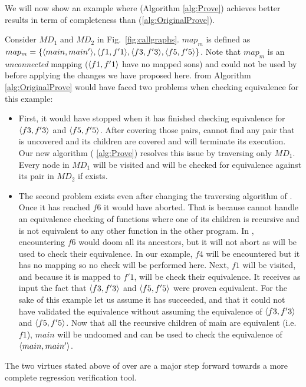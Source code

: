 We will now show an example where  (Algorithm \ref{alg:Prove}) achieves better results in term of completeness than  (\ref{alg:OriginalProve}). 

Consider $MD_1$ and $MD_2$ in Fig.~\ref{fig:callgraphs}. $map_m$ is defined as $map_m = \{ \langle main,main'\rangle,\langle f1,f'1\rangle, \langle f3,f'3\rangle,\langle f5,f'5\rangle\}$. Note that $map_m$ is an \emph{unconnected} mapping ($\langle f1,f'1\rangle$ have no mapped sons) and could not be used by  before applying the changes we have proposed here.  from Algorithm \ref{alg:OriginalProve} would have faced two problems when checking equivalence for this example:
\begin{itemize}
    \item 
First, it would have stopped when it has finished checking equivalence for $\langle f3,f'3\rangle$ and $\langle f5,f'5\rangle$. After covering those pairs,  cannot find any pair that is uncovered and its children are covered and will terminate its execution. Our new algorithm  ( \ref{alg:Prove}) resolves this issue by traversing only $MD_1$. Every node in $MD_1$ will be visited and will be checked for equivalence against its pair in $MD_2$ if exists. 
\item The second problem exists even after changing the traversing algorithm of . Once it has reached $f6$ it would have aborted. That is because  cannot handle an equivalence checking of functions where one of its children is recursive and is not equivalent to any other function in the other program. In , encountering $f6$ would doom all its ancestors, but it will not abort as  will be used to check their equivalence. In our example, $f4$ will be encountered but it has no mapping so no check will be performed here. Next, $f1$ will be visited, and because it is mapped to $f'1$,  will be check their equivalence. It receives as input the fact that $\langle f3,f'3\rangle$ and $\langle f5,f'5\rangle$ were proven equivalent. For the sake of this example let us assume it has succeeded, and that it could not have validated the equivalence without assuming the equivalence of $\langle f3,f'3\rangle$ and $\langle f5,f'5\rangle$. Now that all the recursive children of main are equivalent (i.e. $f1$), $main$ will be undoomed and  can be used to check the equivalence of $\langle main,main'\rangle$.
\end{itemize}



The two virtues stated above of  over  are a major step forward towards a more complete regression verification tool.


